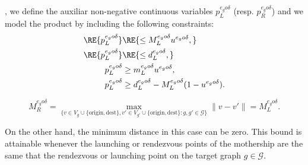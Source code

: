 \noindent
{}, we define the auxiliar non-negative continuous variables $p_L^{e_go\delta}$ (resp. $p_R^{e_go\delta}$) and we model the product by including the following constraints:
\begin{align*}
\RE{p_L^{e_go\delta}} & \RE{\leq  M_L^{e_go\delta}u^{e_go\delta},}\\
\RE{p_L^{e_go\delta}} & \RE{\leq d_L^{e_go\delta},} \\
p_L^{e_go\delta} & \geq m_L^{e_go\delta} u^{e_go\delta}, \\
p_L^{e_go\delta} & \geq d_L^{e_go\delta} - M_L^{e_go\delta}(1-u^{e_go\delta}).
\end{align*}

$$
M_R^{e_go\delta} = \max_{\{v\in V_g\cup\{\text{origin}, \text{dest}\}, v'\in V_{g'}\cup\{\text{origin}, \text{dest}\} : g, g'\in\mathcal G\}} \|v - v'\| = M_L^{e_go\delta}.
$$

\noindent
On the other hand, the minimum distance in this case can be zero. This bound is attainable whenever the launching or rendezvous points of the mothership are the same that the rendezvous or launching point on the target graph $g\in \mathcal{G}$.


